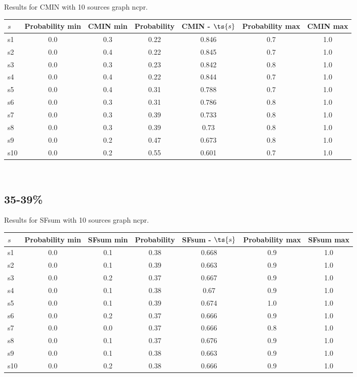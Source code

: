 \documentclass{article}
\begin{document}
\noindent Results for CMIN with 10 sources graph ncpr.

\noindent\begin{tabular}{|l|c|c|c|c|c|c|}
\hline
$s$& Probability min & CMIN min & Probability & CMIN - $\ts{s}$ & Probability max & CMIN max\\
\hline
s1 &0.0 & 0.3 & 0.22 & 0.846 & 0.7 & 1.0\\
\hline
s2 &0.0 & 0.4 & 0.22 & 0.845 & 0.7 & 1.0\\
\hline
s3 &0.0 & 0.3 & 0.23 & 0.842 & 0.8 & 1.0\\
\hline
s4 &0.0 & 0.4 & 0.22 & 0.844 & 0.7 & 1.0\\
\hline
s5 &0.0 & 0.4 & 0.31 & 0.788 & 0.7 & 1.0\\
\hline
s6 &0.0 & 0.3 & 0.31 & 0.786 & 0.8 & 1.0\\
\hline
s7 &0.0 & 0.3 & 0.39 & 0.733 & 0.8 & 1.0\\
\hline
s8 &0.0 & 0.3 & 0.39 & 0.73 & 0.8 & 1.0\\
\hline
s9 &0.0 & 0.2 & 0.47 & 0.673 & 0.8 & 1.0\\
\hline
s10 &0.0 & 0.2 & 0.55 & 0.601 & 0.7 & 1.0\\
\hline
\end{tabular}\\

\newpage

\subsection{35-39\%}

\noindent Results for SFsum with 10 sources graph ncpr.

\noindent\begin{tabular}{|l|c|c|c|c|c|c|}
\hline
$s$& Probability min & SFsum min & Probability & SFsum - $\ts{s}$ & Probability max & SFsum max\\
\hline
s1 &0.0 & 0.1 & 0.38 & 0.668 & 0.9 & 1.0\\
\hline
s2 &0.0 & 0.1 & 0.39 & 0.663 & 0.9 & 1.0\\
\hline
s3 &0.0 & 0.2 & 0.37 & 0.667 & 0.9 & 1.0\\
\hline
s4 &0.0 & 0.1 & 0.38 & 0.67 & 0.9 & 1.0\\
\hline
s5 &0.0 & 0.1 & 0.39 & 0.674 & 1.0 & 1.0\\
\hline
s6 &0.0 & 0.2 & 0.37 & 0.666 & 0.9 & 1.0\\
\hline
s7 &0.0 & 0.0 & 0.37 & 0.666 & 0.8 & 1.0\\
\hline
s8 &0.0 & 0.1 & 0.37 & 0.676 & 0.9 & 1.0\\
\hline
s9 &0.0 & 0.1 & 0.38 & 0.663 & 0.9 & 1.0\\
\hline
s10 &0.0 & 0.2 & 0.38 & 0.666 & 0.9 & 1.0\\
\hline
\end{tabular}\\
\end{document}
